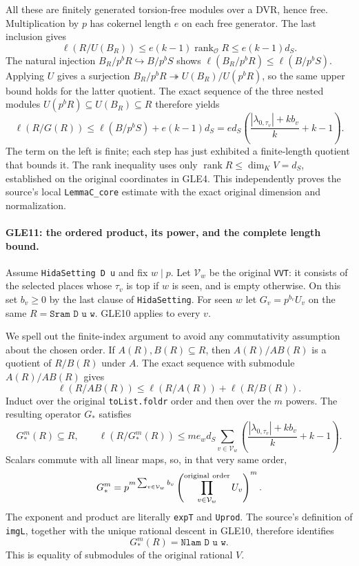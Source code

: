 All these are finitely generated torsion-free modules over a DVR,
hence free.  Multiplication by $p$ has cokernel length $e$ on each
free generator.  The last inclusion gives
\[
 \ell(R/U(B_R))\le e(k-1)\operatorname{rank}_{\mathcal O}R
                                       \le e(k-1)d_S.
\]
The natural injection
$B_R/p^bR\hookrightarrow B/p^bS$ shows
$\ell(B_R/p^bR)\le\ell(B/p^bS)$.
Applying $U$ gives a surjection
$B_R/p^bR\twoheadrightarrow U(B_R)/U(p^bR)$, so the same upper
bound holds for the latter quotient.  The exact sequence of the
three nested modules
$U(p^bR)\subseteq U(B_R)\subseteq R$ therefore yields
\[
 \ell(R/G(R))\le
      \ell(B/p^bS)+e(k-1)d_S
   =e d_S\left(\frac{|\lambda_{0,\tau_v}|+kb_v}{k}+k-1\right).
                                                               \tag{GLE.38}
\]
The term on the left is finite; each step has just exhibited a
finite-length quotient that bounds it.  The rank inequality uses
only $\operatorname{rank}R\le\dim_K V=d_S$, established on the
original coordinates in GLE4.  This independently proves the
source's local \texttt{LemmaC\_core} estimate with the exact
original dimension and normalization.

\paragraph{GLE11: the ordered product, its power, and the complete length bound.}
\label{claim:GLE11}
Assume \texttt{HidaSetting D u} and fix $w\mid p$.
Let $\mathcal V_w$ be the original \texttt{VVT}: it consists of the
selected places whose $\tau_v$ is top if $w$ is seen, and is empty
otherwise.  On this set $b_v\ge0$ by the last clause of
\texttt{HidaSetting}.  For seen $w$ let $G_v=p^{b_v}U_v$ on the
same $R=\texttt{Sram D u w}$.  GLE10 applies to every $v$.

We spell out the finite-index argument to avoid any commutativity
assumption about the chosen order.  If $A(R),B(R)\subseteq R$, then
$A(R)/AB(R)$ is a quotient of $R/B(R)$ under $A$.  The exact
sequence with submodule $A(R)/AB(R)$ gives
\[
 \ell(R/AB(R))\le\ell(R/A(R))+\ell(R/B(R)).                    \tag{GLE.39}
\]
Induct over the original \texttt{toList.foldr} order and then over
the $m$ powers.  The resulting operator $G_*$ satisfies
\[
 G_*^m(R)\subseteq R,\qquad
 \ell(R/G_*^m(R))\le
 m e_wd_S\sum_{v\in\mathcal V_w}
       \left(\frac{|\lambda_{0,\tau_v}|+kb_v}{k}+k-1\right).
                                                               \tag{GLE.40}
\]
Scalars commute with all linear maps, so, in that very same order,
\[
 G_*^m=p^{m\sum_{v\in\mathcal V_w}b_v}
       \left(\prod_{v\in\mathcal V_w}^{\rm original\ order}U_v\right)^m.
\]
The exponent and product are literally \texttt{expT} and
\texttt{Uprod}.  The source's definition of \texttt{imgL}, together
with the unique rational descent in GLE10, therefore identifies
\[
              G_*^m(R)=\texttt{Nlam D u w}.                    \tag{GLE.41}
\]
This is equality of submodules of the original rational $V$.

